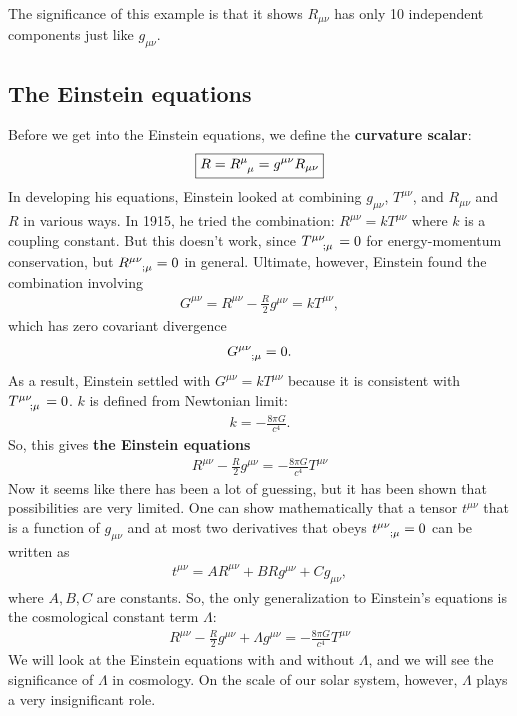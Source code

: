 \documentclass{article}
\theoremstyle{definition}
\begin{document}
The significance of this example is that it shows $R_{\mu\nu}$ has only 10 independent components just like $g_{\mu\nu}$.

\subsection{The Einstein equations}
Before we get into the Einstein equations, we define the \textbf{curvature scalar}:
\begin{align*}
\boxed{R = \tensor{R}{^{\mu}_{\mu}} = g^{\mu\nu}R_{\mu\nu}}
\end{align*}
In developing his equations, Einstein looked at combining $g_{\mu\nu}$, $T^{\mu\nu}$, and $R_{\mu\nu}$ and $R$ in various ways. In 1915, he tried the combination: $R^{\mu\nu} = kT^{\mu\nu}$ where $k$ is a coupling constant. But this doesn't work, since $\tensor{T}{^{\mu\nu}_{;\mu}} = 0$ for energy-momentum conservation, but $\tensor{R}{^{\mu\nu}_{;\mu}} = 0$ in general. Ultimate, however, Einstein found the combination involving 
\begin{align*}
G^{\mu\nu} = R^{\mu\nu} - \frac{R}{2}g^{\mu\nu} = kT^{\mu\nu},
\end{align*}
which has zero covariant divergence
\begin{align*}
\tensor{G}{^{\mu\nu}_{;\mu}} = 0.
\end{align*}
As a result, Einstein settled with $G^{\mu\nu} = kT^{\mu\nu}$ because it is consistent with $\tensor{T}{^{\mu\nu}_{;\mu}} = 0$. $k$ is defined from Newtonian limit:
\begin{align*}
k = -\frac{8\pi G}{c^4}.
\end{align*}
So, this gives \textbf{the Einstein equations}
\begin{align*}
\boxed{R^{\mu\nu} - \frac{R}{2}g^{\mu\nu} = -\frac{8\pi G}{c^4}T^{\mu\nu}}
\end{align*}
Now it seems like there has been a lot of guessing, but it has been shown that possibilities are very limited. One can show mathematically that a tensor $t^{\mu\nu}$ that is a function of $g_{\mu\nu}$ and at most two derivatives that obeys $\tensor{t}{^{\mu\nu}_{;\mu}} = 0$ can be written as 
\begin{align*}
t^{\mu\nu} = AR^{\mu\nu} + BRg^{\mu\nu} + Cg_{\mu\nu},
\end{align*}
where $A,B,C$ are constants. So, the only generalization to Einstein's equations is the cosmological constant term $\Lambda$:
\begin{align*}
\boxed{R^{\mu\nu} - \frac{R}{2}g^{\mu\nu} + \Lambda g^{\mu\nu}= -\frac{8\pi G}{c^4}T^{\mu\nu}}
\end{align*}
We will look at the Einstein equations with and without $\Lambda$, and we will see the significance of $\Lambda$ in cosmology. On the scale of our solar system, however, $\Lambda$ plays a very insignificant role. 
\end{document}
